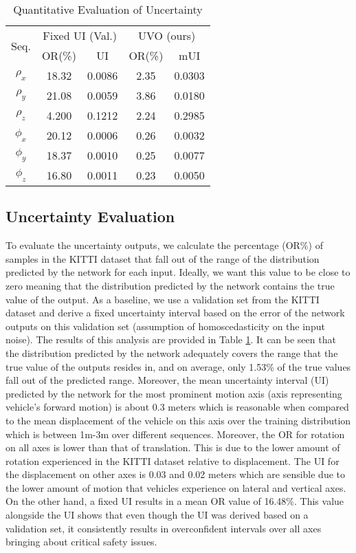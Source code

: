 \documentclass[letterpaper, 10 pt]{ieeeconf}  %
\begin{document}
\begin{table}[!t]
    \centering
    \caption{Quantitative Evaluation of Uncertainty}
    \begin{tabular}{c|cc|cc} \toprule
        \multirow{2}{*}{Seq.} & \multicolumn{2}{c}{Fixed UI (Val.)} & \multicolumn{2}{c}{UVO (ours)} \\
               & OR(\%) & UI & OR(\%) & mUI \\ \midrule
        $\rho_x$ & 18.32 & 0.0086 & 2.35 & 0.0303 \\
        $\rho_y$ & 21.08 & 0.0059 & 3.86 & 0.0180 \\
        $\rho_z$ & 4.200 & 0.1212 & 2.24 & 0.2985 \\ \midrule
        $\phi_x$ & 20.12 & 0.0006 & 0.26 & 0.0032 \\
        $\phi_y$ & 18.37 & 0.0010 & 0.25 & 0.0077 \\
        $\phi_z$ & 16.80 & 0.0011 & 0.23 & 0.0050 \\ \bottomrule
    \end{tabular}
    \label{tab:uncertaintyevaluation}
\end{table}
\subsection{Uncertainty Evaluation}
To evaluate the uncertainty outputs, we calculate the percentage (OR\%) of samples in the KITTI dataset that fall out of the range of the distribution predicted by the network for each input. Ideally, we want this value to be close to zero meaning that the distribution predicted by the network contains the true value of the output. As a baseline, we use a validation set from the KITTI dataset and derive a fixed uncertainty interval based on the error of the network outputs on this validation set (assumption of homoscedasticity on the input noise). The results of this analysis are provided in Table \ref{tab:uncertaintyevaluation}. It can be seen that the distribution predicted by the network adequately covers the range that the true value of the outputs resides in, and on average, only 1.53\% of the true values fall out of the predicted range. Moreover, the mean uncertainty interval (UI) predicted by the network for the most prominent motion axis (axis representing vehicle's forward motion) is about 0.3 meters which is reasonable when compared to the mean displacement of the vehicle on this axis over the training distribution which is between 1m-3m over different sequences. Moreover, the OR for rotation on all axes is lower than that of translation. This is due to the lower amount of rotation experienced in the KITTI dataset relative to displacement. The UI for the displacement on other axes is 0.03 and 0.02 meters which are sensible due to the lower amount of motion that vehicles experience on lateral and vertical axes. On the other hand, a fixed UI results in a mean OR value of 16.48\%. This value alongside the UI shows that even though the UI was derived based on a validation set, it consistently results in overconfident intervals over all axes bringing about critical safety issues.
\end{document}
